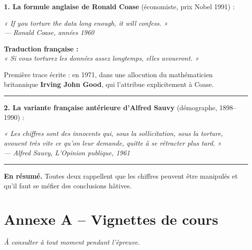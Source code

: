\documentclass[11pt,a4paper]{article}
\begin{document}
\vspace{0.4cm}

\begin{tcolorbox}[colback=bioyellow!50,colframe=bioaccent,title={\textbf{Deux citations pour méditer sur la statistique}},fonttitle=\bfseries]
\small
\textbf{1. La formule anglaise de Ronald Coase} (économiste, prix Nobel 1991) :

\medskip
\emph{« If you torture the data long enough, it will confess. »}\\
\hfill {\itshape --- Ronald Coase, années 1960}

\medskip
\textbf{Traduction française :}\\
\emph{« Si vous torturez les données assez longtemps, elles avoueront. »}

\medskip
Première trace écrite : en 1971, dans une allocution du mathématicien britannique \textbf{Irving John Good}, qui l'attribue explicitement à Coase.

\vspace{0.3cm}
\noindent\rule{\linewidth}{0.4pt}

\vspace{0.2cm}
\textbf{2. La variante française antérieure d'Alfred Sauvy} (démographe, 1898--1990) :

\medskip
\emph{« Les chiffres sont des innocents qui, sous la sollicitation, sous la torture, avouent très vite ce qu'on leur demande, quitte à se rétracter plus tard. »}\\
\hfill {\itshape --- Alfred Sauvy, \emph{L'Opinion publique}, 1961}

\vspace{0.3cm}
\noindent\rule{\linewidth}{0.4pt}

\vspace{0.2cm}
\textbf{En résumé.} Toutes deux rappellent que les chiffres peuvent être manipulés et qu'il faut se méfier des conclusions hâtives.
\end{tcolorbox}

\newpage

\section*{\color{biocolor}Annexe A -- Vignettes de cours}
\emph{À consulter à tout moment pendant l'épreuve.}
\end{document}
